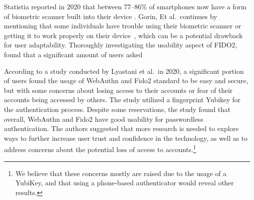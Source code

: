 Statistia reported in 2020 that between 77--86\% of smartphones now have a
form of biometric scanner built into their device
\cite{statista-biometric-transactions}.
Gorin, Et al.\ continues by mentioning that some individuals have trouble
using their biometric scanner or getting it to work properly on their
device~\cite{gordin2021moving}, which can be a potential drawback for user
adaptability.
Thoroughly investigating the usability aspect of FIDO2,~\cite{
  ghrobany2020fido2} found that a significant amount of users asked

According to a study conducted by Lyastani et al.\ in 2020\cite{ghrobany2020fido2},
a significant portion of users found the usage of WebAuthn and Fido2 standard
to be easy and secure, but with some concerns about losing access to their
accounts or fear of their accounts being accessed by others.
The study utilized a fingerprint Yubikey for the authentication process.
Despite some reservations, the study found that overall, WebAuthn and Fido2
have good usability for passwordless authentication.
The authors suggested that more research is needed to explore ways to
further increase user trust and confidence in the technology, as well as to
address concerns about the potential loss of access to accounts.\footnote{
  We believe that these concerns mostly are raised due to the usage of a YubiKey,
  and that using a phone-based authenticator would reveal other results.
}


\iffalse

Our results show that users consider FIDO2 passwordless
authentication as more usable and more acceptable than the
traditional password-based authentication, but also that concerns remain that impede many users’ willingness to abandon
passwords. Most notably, the fear of losing the authenticator
is not only connected with account recovery but also with
an imminent illegal access to the account and the need for
revocation—-a subjective threat model by users that differs
from the objective risk assessment of FIDO2.

\fi
